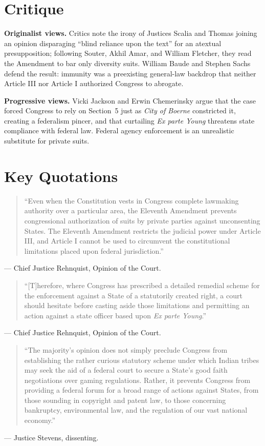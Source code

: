 \documentclass[12pt]{article}
\begin{document}
\section{Critique}

\textbf{Originalist views.} Critics note the irony of Justices Scalia and Thomas joining an opinion disparaging ``blind reliance upon the text'' for an atextual presupposition; following Souter, Akhil Amar, and William Fletcher, they read the Amendment to bar only diversity suits. William Baude and Stephen Sachs defend the result: immunity was a preexisting general-law backdrop that neither Article III nor Article I authorized Congress to abrogate.

\textbf{Progressive views.} Vicki Jackson and Erwin Chemerinsky argue that the case forced Congress to rely on Section~5 just as \textit{City of Boerne} constricted it, creating a federalism pincer, and that curtailing \textit{Ex parte Young} threatens state compliance with federal law. Federal agency enforcement is an unrealistic substitute for private suits.

\section{Key Quotations}

\begin{quote}
``Even when the Constitution vests in Congress complete lawmaking authority over a particular area, the Eleventh Amendment prevents congressional authorization of suits by private parties against unconsenting States. The Eleventh Amendment restricts the judicial power under Article III, and Article I cannot be used to circumvent the constitutional limitations placed upon federal jurisdiction.''
\end{quote}
\noindent --- Chief Justice Rehnquist, Opinion of the Court.

\begin{quote}
``[T]herefore, where Congress has prescribed a detailed remedial scheme for the enforcement against a State of a statutorily created right, a court should hesitate before casting aside those limitations and permitting an action against a state officer based upon \textit{Ex parte Young}.''
\end{quote}
\noindent --- Chief Justice Rehnquist, Opinion of the Court.

\begin{quote}
``The majority's opinion does not simply preclude Congress from establishing the rather curious statutory scheme under which Indian tribes may seek the aid of a federal court to secure a State's good faith negotiations over gaming regulations. Rather, it prevents Congress from providing a federal forum for a broad range of actions against States, from those sounding in copyright and patent law, to those concerning bankruptcy, environmental law, and the regulation of our vast national economy.''
\end{quote}
\noindent --- Justice Stevens, dissenting.
\end{document}

